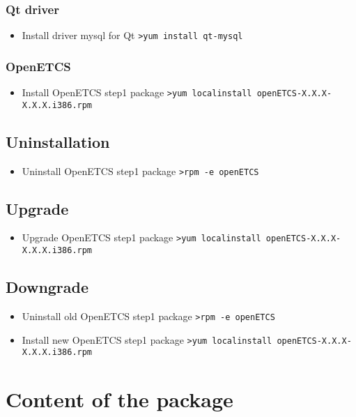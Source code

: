 \documentclass{template/openetcs_article}
\begin{document}
\subsubsection{Qt driver}
\begin{itemize}
	\item Install driver mysql for Qt
	\newline
	\verb|>yum install qt-mysql |
\end{itemize}	

\subsubsection{OpenETCS}
\begin{itemize}
	\item Install OpenETCS step1 package
	\newline
	\verb|>yum localinstall openETCS-X.X.X-X.X.X.i386.rpm |
\end{itemize}	
\subsection{Uninstallation}
\begin{itemize}
	\item Uninstall OpenETCS step1 package
	\newline
	\verb|>rpm -e openETCS|
\end{itemize}
\subsection{Upgrade}
\begin{itemize}
	\item Upgrade OpenETCS step1 package
	\newline
	\verb|>yum localinstall openETCS-X.X.X-X.X.X.i386.rpm|
\end{itemize}	
\subsection{Downgrade}
\begin{itemize}
	\item Uninstall old OpenETCS step1 package
	\newline
	\verb|>rpm -e openETCS|
	\item Install new OpenETCS step1 package
	\newline
	\verb|>yum localinstall openETCS-X.X.X-X.X.X.i386.rpm|	
\end{itemize}		
\newpage
\section{Content of the package}
\end{document}
